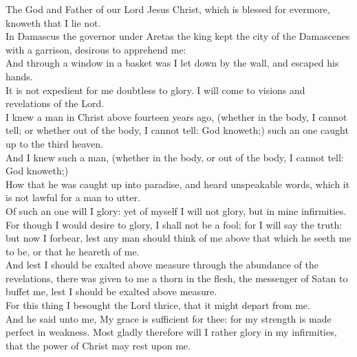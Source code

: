 \documentclass[10pt]{article} %
\begin{document}
{\begin{minipage}[t]{0.45\textwidth}
The God and Father of our Lord Jesus Christ, which is blessed for evermore, knoweth that I lie not.\\
In Damascus the governor under Aretas the king kept the city of the Damascenes with a garrison, desirous to apprehend me:\\
And through a window in a basket was I let down by the wall, and escaped his hands.\\
It is not expedient for me doubtless to glory. I will come to visions and revelations of the Lord.\\
I knew a man in Christ above fourteen years ago, (whether in the body, I cannot tell; or whether out of the body, I cannot tell: God knoweth;) such an one caught up to the third heaven.\\
And I knew such a man, (whether in the body, or out of the body, I cannot tell: God knoweth;)\\
How that he was caught up into paradise, and heard unspeakable words, which it is not lawful for a man to utter.\\
Of such an one will I glory: yet of myself I will not glory, but in mine infirmities.\\
For though I would desire to glory, I shall not be a fool; for I will say the truth: but now I forbear, lest any man should think of me above that which he seeth me to be, or that he heareth of me.\\
And lest I should be exalted above measure through the abundance of the revelations, there was given to me a thorn in the flesh, the messenger of Satan to buffet me, lest I should be exalted above measure.\\
For this thing I besought the Lord thrice, that it might depart from me.\\
And he said unto me, My grace is sufficient for thee: for my strength is made perfect in weakness. Most gladly therefore will I rather glory in my infirmities, that the power of Christ may rest upon me.\\
\end{minipage}}
\newpage\huge\singlespacing
\end{document}
